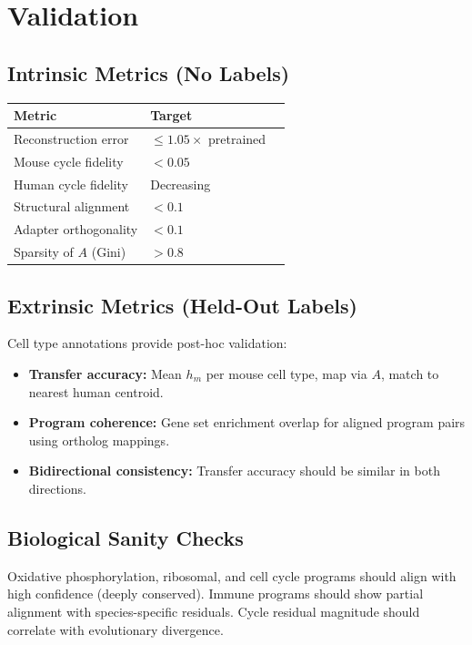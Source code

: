 \documentclass[10pt,twocolumn,letterpaper]{article}
\begin{document}
\section{Validation}

\subsection{Intrinsic Metrics (No Labels)}

\begin{table}[h]
\centering\small
\begin{tabular}{@{}llr@{}}
\toprule
Metric & Target \\
\midrule
Reconstruction error & $\leq 1.05\times$ pretrained \\
Mouse cycle fidelity & $< 0.05$ \\
Human cycle fidelity & Decreasing \\
Structural alignment & $< 0.1$ \\
Adapter orthogonality & $< 0.1$ \\
Sparsity of $A$ (Gini) & $> 0.8$ \\
\bottomrule
\end{tabular}
\end{table}

\subsection{Extrinsic Metrics (Held-Out Labels)}

Cell type annotations provide post-hoc validation:
\begin{itemize}
  \item \textbf{Transfer accuracy:} Mean $h_m$ per mouse cell type, map via
        $A$, match to nearest human centroid.
  \item \textbf{Program coherence:} Gene set enrichment overlap for aligned
        program pairs using ortholog mappings.
  \item \textbf{Bidirectional consistency:} Transfer accuracy should be
        similar in both directions.
\end{itemize}

\subsection{Biological Sanity Checks}

Oxidative phosphorylation, ribosomal, and cell cycle programs should align
with high confidence (deeply conserved). Immune programs should show partial
alignment with species-specific residuals. Cycle residual magnitude should
correlate with evolutionary divergence.
\end{document}
